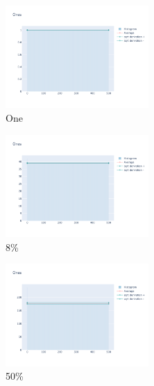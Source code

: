 \documentclass[12pt, fleqn]{report}                             %
\theoremstyle{break}                                            %
\begin{document}
      \begin{figure}[ht!]
        \centering
        \begin{subfigure}[b]{0.4\linewidth}
          \includegraphics[width=0.6\textwidth]{Images/138/dia-a.png}
          \caption{One}
        \end{subfigure}
        \begin{subfigure}[b]{0.4\linewidth}
          \includegraphics[width=0.6\textwidth]{Images/138/dia-b.png}
          \caption{8\%}
        \end{subfigure}
        \begin{subfigure}[b]{0.4\linewidth}
          \includegraphics[width=0.6\textwidth]{Images/138/dia-c.png}
          \caption{50\%}
        \end{subfigure}
        \begin{subfigure}[b]{0.4\linewidth}

\end{subfigure}
\end{figure}
\end{document}

